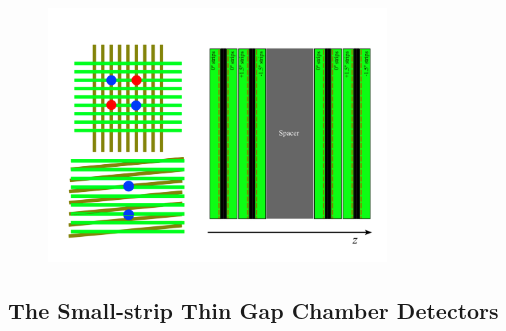 \begin{figure}[!htb]
    \begin{center}
        \includegraphics[width=0.8\textwidth]{figures/nsw/mm_ghost_stereoPDF}
        \caption{
        }
        \label{fig:mm_stereo}
    \end{center}
\end{figure}

\subsection{The Small-strip Thin Gap Chamber Detectors}
\label{sec:nsw_stgc}
